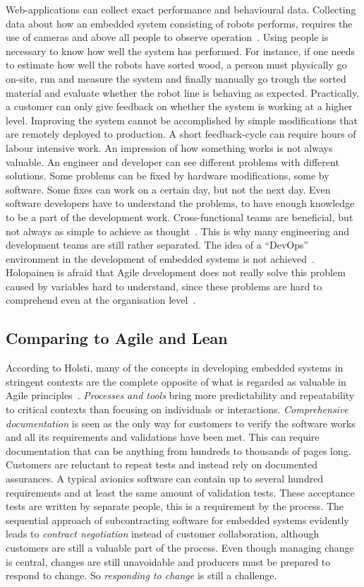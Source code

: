 \documentclass[english]{tktltiki2}
\begin{document}
Web-applications can collect exact performance and behavioural data. Collecting data about how an embedded system consisting of robots performs, requires the use of cameras and above all people to observe operation~\cite{Hol15a}. Using people is necessary to know how well the system has performed. For instance, if one needs to estimate how well the robots have sorted wood, a person must physically go on-site, run and measure the system and finally manually go trough the sorted material and evaluate whether the robot line is behaving as expected. Practically, a customer can only give feedback on whether the system is working at a higher level. Improving the system cannot be accomplished by simple modifications that are remotely deployed to production. A short feedback-cycle can require hours of labour intensive work. An impression of how something works is not always valuable. An engineer and developer can see different problems with different solutions. Some problems can be fixed by hardware modifications, some by software. Some fixes can work on a certain day, but not the next day. Even software developers have to understand the problems, to have enough knowledge to be a part of the development work. Cross-functional teams are beneficial, but not always as simple to achieve as thought~\cite{BT15, Hol15a}. This is why many engineering and development teams are still rather separated. The idea of a “DevOps” environment in the development of embedded systems is not achieved~\cite{BT15}. Holopainen is afraid that Agile development does not really solve this problem caused by variables hard to understand, since these problems are hard to comprehend even at the organisation level~\cite{Hol15a}.

\subsection{Comparing to Agile and Lean}

According to Holsti, many of the concepts in developing embedded systems in stringent contexts are the complete opposite of what is regarded as valuable in Agile principles~\cite{Hol15b}. \emph{Processes and tools} bring more predictability and repeatability to critical contexts than focusing on individuals or interactions. \emph{Comprehensive documentation} is seen as the only way for customers to verify the software works and all its requirements and validations have been met. This can require documentation that can be anything from hundreds to thousands of pages long. Customers are reluctant to repeat tests and instead rely on documented assurances. A typical avionics software can contain up to several hundred requirements and at least the same amount of validation tests. These acceptance tests are written by separate people, this is a requirement by the process. The sequential approach of subcontracting software for embedded systems evidently leads to \emph{contract negotiation} instead of customer collaboration, although customers are still a valuable part of the process. Even though managing change is central, changes are still unavoidable and producers must be prepared to respond to change. So \emph{responding to change} is still a challenge.
\end{document}
